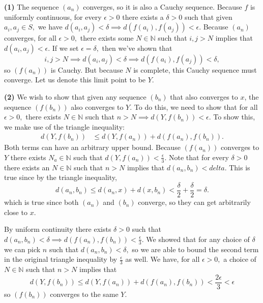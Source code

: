 \documentclass{article}
\numberwithin{equation}{section}
\begin{document}
\begin{enumerate}
\begin{enumerate}
        \textbf{(1)} The sequence $(a_n)$ converges, so it is also a Cauchy sequence. Because $f$ is uniformly continuous, for every $\epsilon > 0$ there exists a $\delta >0$ such that given $a_i,a_j \in S,$ we have $d(a_i,a_j)<\delta \implies d(f(a_i),f(a_j))<\epsilon.$ Because $(a_n)$ converges, for all $\epsilon > 0,$ there exists some $N\in \mathbb{N}$ such that $i,j>N$ implies that $d(a_{i}, a_{j}) < \epsilon.$ If we set $\epsilon = \delta,$ then we've shown that 
        \begin{equation*}
            i,j > N \implies d(a_i, a_j) < \delta \implies d(f(a_i), f(a_j)) < \delta,
        \end{equation*}
        so $(f(a_n))$ is Cauchy. But because $N$ is complete, this Cauchy sequence must converge. Let us denote this limit point to be $Y.$
        
        \textbf{(2)} We wish to show that given any sequence $(b_n)$ that also converges to $x$, the sequence $(f(b_n))$ also converges to $Y.$ To do this, we need to show that for all $\epsilon > 0,$ there exists $N\in \mathbb{N}$ such that $n>N \implies d(Y,f(b_n)) < \epsilon.$ To show this, we make use of the triangle inequality:
        \begin{align}
            d(Y,f(b_n)) &\le d(Y,f(a_n)) + d(f(a_n), f(b_n)).
        \end{align}
        Both terms can have an arbitrary upper bound. Because $(f(a_n))$ converges to $Y$ there exists $N_a \in \mathbb{N}$ such that $d(Y,f(a_n)) < \frac{\epsilon}{3}.$ Note that for every $\delta >0$ there exists an $N\in\mathbb{N}$ such that $n>N$ implies that $d(a_n,b_n) < delta.$ This is true since by the triangle inequality,
        \begin{equation}
            d(a_n,b_n) \le d(a_n,x) + d(x,b_n) < \frac{\delta}{2} + \frac{\delta}{2} = \delta.
        \end{equation}
        which is true since both $(a_n)$ and $(b_n)$ converge, so they can get arbitrarily close to $x.$ 

        By uniform continuity there exists $\delta >0$ such that $d(a_n,b_n)<\delta \implies d(f(a_n),f(b_n)) < \frac{\epsilon}{3}.$ We showed that for any choice of $\delta$ we can pick $n$ such that $d(a_n,b_n)<\delta,$ so we are able to bound the second term in the original triangle inequality by $\frac{\epsilon}{3}$ as well. We have, for all $\epsilon >0,$ a choice of $N\in \mathbb{N}$ such that $n>N$ implies that
        \begin{equation}
            d(Y,f(b_n)) \le d(Y,f(a_n)) + d(f(a_n), f(b_n)) < \frac{2\epsilon}{3} < \epsilon
        \end{equation}
        so $(f(b_n))$ converges to the same $Y.$


\end{enumerate}
\end{enumerate}
\end{document}
